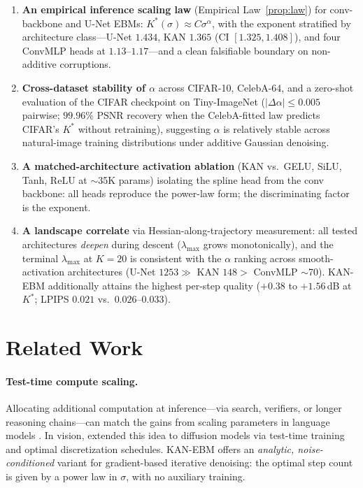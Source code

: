 \documentclass{article}
\begin{document}
\begin{enumerate}[leftmargin=*,topsep=2pt,itemsep=1pt,parsep=0pt]
\item \textbf{An empirical inference scaling law} (Empirical Law~\ref{prop:law}) for conv-backbone and U-Net EBMs: $K^{*}(\sigma) \approx C\sigma^{\alpha}$, with the exponent stratified by architecture class---U-Net $1.434$, KAN $1.365$ (CI $[1.325, 1.408]$), and four ConvMLP heads at $1.13$--$1.17$---and a clean falsifiable boundary on non-additive corruptions.
\item \textbf{Cross-dataset stability of $\alpha$} across CIFAR-10, CelebA-64, and a zero-shot evaluation of the CIFAR checkpoint on Tiny-ImageNet ($|\Delta\alpha|\!\leq\!0.005$ pairwise; $99.96\%$ PSNR recovery when the CelebA-fitted law predicts CIFAR's $K^*$ without retraining), suggesting $\alpha$ is relatively stable across natural-image training distributions under additive Gaussian denoising.
\item \textbf{A matched-architecture activation ablation} (KAN vs.~GELU, SiLU, Tanh, ReLU at $\sim$35K params) isolating the spline head from the conv backbone: all heads reproduce the power-law form; the discriminating factor is the exponent.
\item \textbf{A landscape correlate} via Hessian-along-trajectory measurement: all tested architectures \emph{deepen} during descent ($\lambda_{\max}$ grows monotonically), and the terminal $\lambda_{\max}$ at $K{=}20$ is consistent with the $\alpha$ ranking across smooth-activation architectures (U-Net $1253 \!\gg\!$ KAN $148 \!>\!$ ConvMLP $\sim$70). KAN-EBM additionally attains the highest per-step quality ($+0.38$ to $+1.56$\,dB at $K^*$; LPIPS $0.021$ vs.~$0.026$--$0.033$).
\end{enumerate}

\section{Related Work}
\label{sec:related}

\paragraph{Test-time compute scaling.} Allocating additional computation at inference---via search, verifiers, or longer reasoning chains---can match the gains from scaling parameters in language models \citep{snell2024llm, brown2024llm_scaling}. In vision, \citet{wu2025inference, wu2024inference} extended this idea to diffusion models via test-time training and optimal discretization schedules. KAN-EBM offers an \emph{analytic, noise-conditioned} variant for gradient-based iterative denoising: the optimal step count is given by a power law in $\sigma$, with no auxiliary training.
\end{document}
